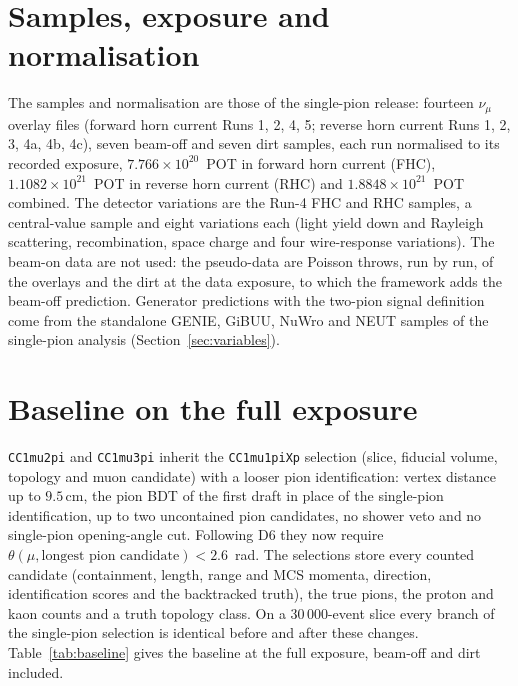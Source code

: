 \documentclass[11pt,a4paper]{article}
\newcommand{\cm}{\,\text{cm}}
\begin{document}
\section{Samples, exposure and normalisation}
\label{sec:samples}

The samples and normalisation are those of the single-pion release: fourteen $\nu_\mu$ overlay files
(forward horn current Runs 1, 2, 4, 5; reverse horn current Runs 1, 2, 3, 4a, 4b, 4c), seven beam-off
and seven dirt samples, each run normalised to its recorded exposure, $7.766\times10^{20}$~POT in
forward horn current (FHC), $1.1082\times10^{21}$~POT in reverse horn current (RHC) and
$1.8848\times10^{21}$~POT combined. The detector variations are the Run-4 FHC and RHC samples, a
central-value sample and eight variations each (light yield down and Rayleigh scattering,
recombination, space charge and four wire-response variations). The beam-on data are not used: the
pseudo-data are Poisson throws, run by run, of the overlays and the dirt at the data exposure, to
which the framework adds the beam-off prediction. Generator predictions with the two-pion signal definition come from
the standalone GENIE, GiBUU, NuWro and NEUT samples of the single-pion analysis (Section~\ref{sec:variables}).

\section{Baseline on the full exposure}
\label{sec:baseline}

\texttt{CC1mu2pi} and \texttt{CC1mu3pi} inherit the \texttt{CC1mu1piXp} selection (slice, fiducial
volume, topology and muon candidate) with a looser pion identification: vertex distance up to
$9.5\cm$, the pion BDT of the first draft in place of the single-pion identification, up to two
uncontained pion candidates, no shower veto and no single-pion opening-angle cut. Following D6 they
now require $\theta(\mu,\text{longest pion candidate})<2.6$~rad. The selections store every counted
candidate (containment, length, range and MCS momenta, direction, identification scores and the
backtracked truth), the true pions, the proton and kaon counts and a truth topology class. On a
30\,000-event slice every branch of the single-pion selection is identical before and after these
changes. Table~\ref{tab:baseline} gives the baseline at the full exposure, beam-off and dirt included.
\end{document}
